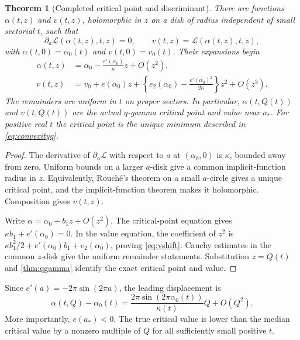 \documentclass[11pt,a4paper]{article}
\numberwithin{equation}{section}
\newtheorem{theorem}{Theorem}[section]
\theoremstyle{definition}
\theoremstyle{remark}
\begin{document}
\begin{theorem}[Completed critical point and discriminant]
\label{thm:critical}
There are functions $\alpha(t,z)$ and $v(t,z)$, holomorphic in $z$ on
a disk of radius independent of small sectorial $t$, such that
\begin{equation}
 \partial_a\mathscr L(\alpha(t,z),t,z)=0,\qquad
 v(t,z)=\mathscr L(\alpha(t,z),t,z),
 \label{eq:completedcritical}
\end{equation}
with $\alpha(t,0)=\alpha_0(t)$ and $v(t,0)=v_0(t)$. Their expansions
begin
\begin{align}
 \alpha(t,z)&=\alpha_0-\frac{e'(\alpha_0)}{\kappa}z+O(z^2),
 \label{eq:alphashift}\\
 v(t,z)&=v_0+e(\alpha_0)z
 +\left\{e_2(\alpha_0)-\frac{e'(\alpha_0)^2}{2\kappa}\right\}z^2
 +O(z^3).
 \label{eq:vshift}
\end{align}
The remainders are uniform in $t$ on proper sectors. In particular,
$\alpha(t,Q(t))$ and $v(t,Q(t))$ are the actual $q$-gamma critical
point and value near $a_*$. For positive real $t$ the critical point
is the unique minimum described in \eqref{eq:convexityq}.
\end{theorem}
\begin{proof}
The derivative of $\partial_a\mathscr L$ with respect to $a$ at
$(\alpha_0,0)$ is $\kappa$, bounded away from zero. Uniform bounds on
a larger $a$-disk give a common implicit-function radius in $z$.
Equivalently, Rouch\'e's theorem on a small $a$-circle gives a unique
critical point, and the implicit-function theorem makes it
holomorphic. Composition gives $v(t,z)$.

Write $\alpha=\alpha_0+b_1z+O(z^2)$. The critical-point equation gives
$\kappa b_1+e'(\alpha_0)=0$. In the value equation, the coefficient of
$z^2$ is
$\kappa b_1^2/2+e'(\alpha_0)b_1+e_2(\alpha_0)$, proving
\eqref{eq:vshift}. Cauchy estimates in the common $z$-disk give the
uniform remainder statements. Substitution $z=Q(t)$ and
\cref{thm:qgamma} identify the exact critical point and value.
\end{proof}

Since $e'(a)=-2\pi\sin(2\pi a)$, the leading displacement is
\begin{equation}
 \alpha(t,Q)-\alpha_0(t)
 =\frac{2\pi\sin(2\pi\alpha_0(t))}{\kappa(t)}Q+O(Q^2).
 \label{eq:alphashifttrig}
\end{equation}
More importantly, $e(a_*)<0$. The true critical value is lower than
the median critical value by a nonzero multiple of $Q$ for all
sufficiently small positive $t$.
\end{document}
